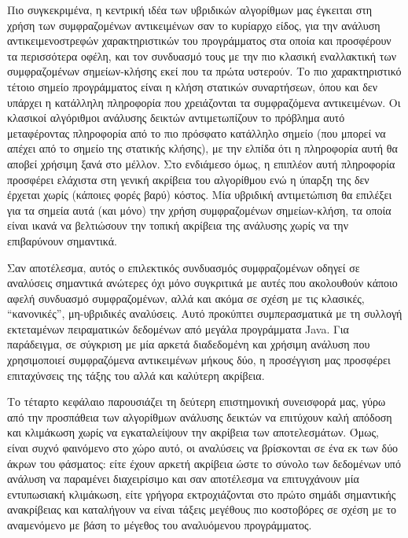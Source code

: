 Πιο συγκεκριμένα, η κεντρική ιδέα των υβριδικών αλγορίθμων μας έγκειται στη χρήση των συμφραζομένων αντικειμένων σαν το κυρίαρχο είδος, για την ανάλυση αντικειμενοστρεφών χαρακτηριστικών του προγράμματος στα οποία και προσφέρουν τα περισσότερα οφέλη, και τον συνδυασμό τους με την πιο κλασική εναλλακτική των συμφραζομένων σημείων-κλήσης εκεί που τα πρώτα υστερούν. Το πιο χαρακτηριστικό τέτοιο σημείο προγράμματος είναι η κλήση στατικών συναρτήσεων, όπου και δεν υπάρχει η κατάλληλη πληροφορία που χρειάζονται τα συμφραζόμενα αντικειμένων. Οι κλασικοί αλγόριθμοι ανάλυσης δεικτών αντιμετωπίζουν το πρόβλημα αυτό μεταφέροντας πληροφορία από το πιο πρόσφατο κατάλληλο σημείο (που μπορεί να απέχει από το σημείο της στατικής κλήσης), με την ελπίδα ότι η πληροφορία αυτή θα αποβεί χρήσιμη ξανά στο μέλλον. Στο ενδιάμεσο όμως, η επιπλέον αυτή πληροφορία προσφέρει ελάχιστα στη γενική ακρίβεια του αλγορίθμου ενώ η ύπαρξη της δεν έρχεται χωρίς (κάποιες φορές βαρύ) κόστος. Μία υβριδική αντιμετώπιση θα επιλέξει για τα σημεία αυτά (και μόνο) την χρήση συμφραζομένων σημείων-κλήση, τα οποία είναι ικανά να βελτιώσουν την τοπική ακρίβεια της ανάλυσης χωρίς να την επιβαρύνουν σημαντικά.

Σαν αποτέλεσμα, αυτός ο επιλεκτικός συνδυασμός συμφραζομένων οδηγεί σε αναλύσεις σημαντικά ανώτερες όχι μόνο συγκριτικά με αυτές που ακολουθούν κάποιο αφελή συνδυασμό συμφραζομένων, αλλά και ακόμα σε σχέση με τις κλασικές, ``κανονικές'', μη-υβριδικές αναλύσεις. Αυτό προκύπτει συμπερασματικά με τη συλλογή εκτεταμένων πειραματικών δεδομένων από μεγάλα προγράμματα {\en Java}. Για παράδειγμα, σε σύγκριση με μία αρκετά διαδεδομένη και χρήσιμη ανάλυση που χρησιμοποιεί συμφραζόμενα αντικειμένων μήκους δύο, η προσέγγιση μας προσφέρει επιταχύνσεις της τάξης του {\en {}} αλλά και καλύτερη ακρίβεια.


Το τέταρτο κεφάλαιο παρουσιάζει τη δεύτερη επιστημονική συνεισφορά μας, γύρω από την προσπάθεια των αλγορίθμων ανάλυσης δεικτών να επιτύχουν καλή απόδοση και κλιμάκωση χωρίς να εγκαταλείψουν την ακρίβεια των αποτελεσμάτων. \mbox{Όμως}, είναι συχνό φαινόμενο στο χώρο αυτό, οι αναλύσεις να βρίσκονται σε ένα εκ των δύο άκρων του φάσματος: είτε έχουν αρκετή ακρίβεια ώστε το σύνολο των δεδομένων υπό ανάλυση να παραμένει διαχειρίσιμο και σαν αποτέλεσμα να επιτυγχάνουν μία εντυπωσιακή κλιμάκωση, είτε γρήγορα εκτροχιάζονται στο πρώτο σημάδι σημαντικής ανακρίβειας και καταλήγουν να \mbox{είναι} τάξεις μεγέθους πιο κοστοβόρες σε σχέση με το αναμενόμενο με βάση το μέγεθος του αναλυόμενου προγράμματος.

